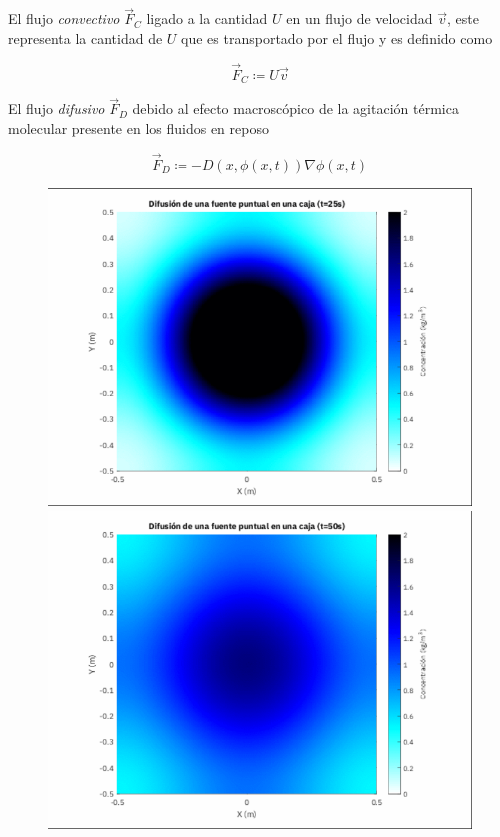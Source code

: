 El flujo \emph{convectivo} $\vec{F}_{C}$ ligado a la cantidad $U$ en
un flujo de velocidad $\vec{v}$, este representa la cantidad de $U$
que es transportado por el flujo y es definido como

\begin{equation}
    \vec{F}_{C}\coloneqq
    U\vec{v}
\end{equation}

El flujo \emph{difusivo} $\vec{F}_{D}$ debido al efecto macroscópico de la
agitación térmica molecular presente en los fluidos en reposo

\begin{equation}
    \vec{F}_{D}\coloneqq
    -D\left(x,\phi\left(x,t\right)\right)
    \nabla\phi\left(x,t\right)
\end{equation}

\begin{figure}[ht!]
    \centering
    \includegraphics[width=.3\paperwidth]{E_IMAGENES/1_Capitulo2/25.png}\qquad
    \includegraphics[width=.3\paperwidth]{E_IMAGENES/1_Capitulo2/50.png}

\end{figure}

